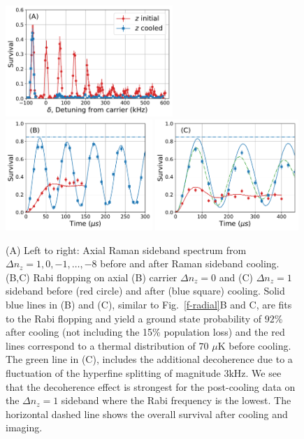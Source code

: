 \documentclass[aps,prl,twocolumn,groupedaddress]{revtex4-1}
\begin{document}
\begin{figure}
  \includegraphics[height=4.2cm]{imgs/spectrum_a1.pdf}
  \includegraphics[height=4.2cm]{imgs/rabi_flop_a1_0.pdf}
  \includegraphics[height=4.2cm]{imgs/rabi_flop_a1_p1.pdf}
  \caption{(A) Left to right: Axial Raman sideband spectrum from $\Delta n_z=1,0,-1,\ldots,-8$    before and after Raman sideband cooling.
    (B,C) Rabi flopping on axial (B) carrier $\Delta n_z=0$  and (C) $\Delta n_z=1$ sideband
    before (red circle) and after (blue square) cooling.
    Solid blue lines in (B) and (C), similar to Fig.~\ref{f-radial}B and C, are fits to  the Rabi flopping and yield  a ground state probability of $92$\% after cooling (not including the 15\% population loss) and
    the red lines correspond to a thermal distribution of $70$ $\mu$K before cooling.
    The green line in (C), includes the additional decoherence due to a fluctuation of the hyperfine splitting of magnitude 3kHz. %
    We see that the decoherence effect is  strongest for the post-cooling data on
    the $\Delta n_z=1$ sideband where the Rabi frequency is the lowest.
    The horizontal dashed line shows the overall survival after cooling and imaging.
    \label{f-axial}}
\end{figure}
\end{document}
